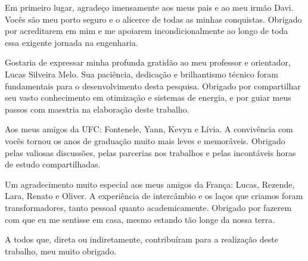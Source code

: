 Em primeiro lugar, agradeço imensamente aos meus pais e ao meu irmão Davi. Vocês são meu porto seguro e o alicerce de todas as minhas conquistas. Obrigado por acreditarem em mim e me apoiarem incondicionalmente ao longo de toda essa exigente jornada na engenharia.

Gostaria de expressar minha profunda gratidão ao meu professor e orientador, Lucas Silveira Melo. Sua paciência, dedicação e brilhantismo técnico foram fundamentais para o desenvolvimento desta pesquisa. Obrigado por compartilhar seu vasto conhecimento em otimização e sistemas de energia, e por guiar meus passos com maestria na elaboração deste trabalho.

Aos meus amigos da UFC: Fontenele, Yann, Kevyn e Lívia. A convivência com vocês tornou os anos de graduação muito mais leves e memoráveis. Obrigado pelas valiosas discussões, pelas parcerias nos trabalhos e pelas incontáveis horas de estudo compartilhadas.

Um agradecimento muito especial aos meus amigos da França: Lucas, Rezende, Lara, Renato e Oliver. A experiência de intercâmbio e os laços que criamos foram transformadores, tanto pessoal quanto academicamente. Obrigado por fazerem com que eu me sentisse em casa, mesmo estando tão longe da nossa terra.

A todos que, direta ou indiretamente, contribuíram para a realização deste trabalho, meu muito obrigado.